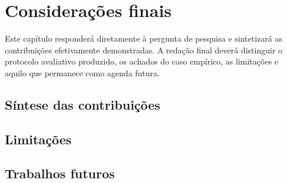 \section{Considerações finais}

Este capítulo responderá diretamente à pergunta de pesquisa e sintetizará as contribuições efetivamente demonstradas. A redação final deverá distinguir o protocolo avaliativo produzido, os achados do caso empírico, as limitações e aquilo que permanece como agenda futura.

\subsection{Síntese das contribuições}


\subsection{Limitações}


\subsection{Trabalhos futuros}

